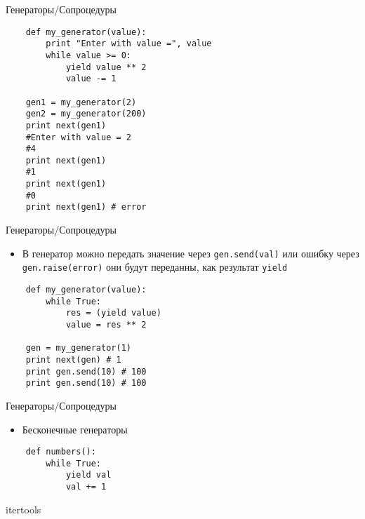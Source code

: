 \documentclass{article}
\begin{document}
\begin{center} Генераторы/Сопроцедуры \end{center}
\vspace{15pt}
\begin{lstlisting}
    def my_generator(value):
        print "Enter with value =", value
        while value >= 0:
            yield value ** 2
            value -= 1

    gen1 = my_generator(2)
    gen2 = my_generator(200)
    print next(gen1) 
    #Enter with value = 2
    #4
    print next(gen1)
    #1
    print next(gen1)
    #0
    print next(gen1) # error
\end{lstlisting}
\newpage

\begin{center} Генераторы/Сопроцедуры \end{center}
\begin{itemize}
    \item В генератор можно передать значение через \lstinline!gen.send(val)!
        или ошибку через \lstinline!gen.raise(error)! они будут переданны, как 
        результат \lstinline!yield!
\end{itemize}
\vspace{15pt}
\begin{lstlisting}
    def my_generator(value):
        while True:
            res = (yield value)
            value = res ** 2

    gen = my_generator(1)
    print next(gen) # 1
    print gen.send(10) # 100
    print gen.send(10) # 100
\end{lstlisting}
\newpage

\begin{center} Генераторы/Сопроцедуры \end{center}
\begin{itemize}
    \item Бесконечные генераторы
\end{itemize}
\vspace{15pt}
\begin{lstlisting}
    def numbers():
        while True:
            yield val
            val += 1
\end{lstlisting}
\newpage

\begin{center} itertools \end{center}
\newpage
\end{document}
